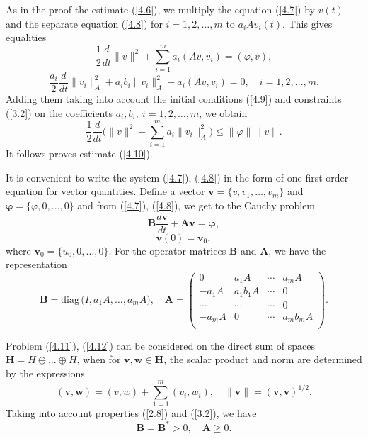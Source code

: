 \documentclass[3p]{elsarticle}
\numberwithin{equation}{section}
\begin{document}
\begin{pf}
As in the proof the estimate (\ref{4.6}), we multiply the equation (\ref{4.7}) by $v(t)$ and the separate equation (\ref{4.8}) for $i = 1,2, \ldots, m$ to $a_i A v_i (t)$. This gives equalities
\[
 \frac{1}{2}  \frac{d}{d t} \|v\|^2 + \sum_{i=1}^{m} a_i (A v,v_i) = (\varphi, v),
\] 
\[
 \frac{a_i}{2} \frac{d}{d t} \|v_i\|_{A}^2 + a_i b_i  \|v_i\|_{A}^2 - a_i (A v,v_i) = 0 ,
 \quad i = 1,2, \ldots, m .  
\] 
Adding them taking into account the initial conditions (\ref{4.9}) and constraints (\ref{3.2}) on the coefficients $a_i, b_i, \  i = 1,2, \ldots, m$, we obtain
\[
 \frac{1}{2}  \frac{d}{d t} \Big ( \|v\|^2 + \sum_{i=1}^{m} a_i \|v_i\|_{A}^2 \Big ) \leq \|\varphi \| \| v\| .
\] 
It follows proves estimate (\ref{4.10}).
\end{pf}

It is convenient to write the system (\ref{4.7}), (\ref{4.8}) in the form of one first-order equation for vector quantities.
Define a vector 
$\bm v = \{v, v_1, \ldots, v_m \} $ and $\bm \varphi  = \{\varphi, 0, \ldots, 0 \} $
and from (\ref{4.7}), (\ref{4.8}), we get to the Cauchy problem
\begin{equation}\label{4.11}
 \bm B \frac{d \bm v}{d t} + \bm A \bm v = \bm \varphi  ,
\end{equation} 
\begin{equation}\label{4.12}
 \bm v(0) = \bm v_0 ,
\end{equation} 
where $\bm v_0 = \{u_0, 0, \ldots, 0 \}$.
For the operator matrices $\bm B$ and $\bm A$,  we have the representation
\[
 \bm B = \mathrm{diag} \, \big (I, a_1 A, \ldots, a_m A \big),
 \quad \bm A = \left (\begin{array}{cccc}
  0  &  a_1 A & \cdots &  a_m A \\
  - a_1 A  &  a_1 b_1 A & \cdots &  0 \\
  \cdots  & \cdots & \cdots &  0 \\
  - a_m A &  0 & \cdots &  a_m b_m A  \\
\end{array}
 \right ) .
\]

Problem (\ref{4.11}), (\ref{4.12}) can be 
considered on the direct sum of spaces $\bm H = H \oplus \ldots  \oplus H$,
when for $\bm v, \bm w \in \bm H$,  the scalar product and norm are determined by the expressions
\[
 (\bm v, \bm w) = (v, w) + \sum_{1=1}^{m} (v_i, w_i),
 \quad \|\bm v\| =  (\bm v, \bm v)^{1/2} .
\]
Taking into account properties (\ref{2.8}) and (\ref{3.2}), we have
\begin{equation}\label{4.13}
 \bm B = \bm B^* > 0,
 \quad \bm A \geq 0 . 
\end{equation} 
\end{document}
